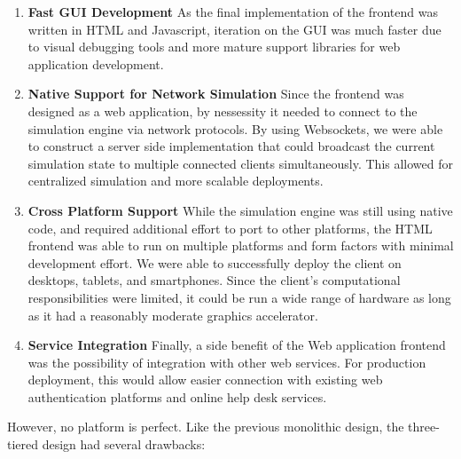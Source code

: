  \begin{enumerate}
   \item \textbf{Fast GUI Development} As the final implementation of
     the frontend was written in HTML and Javascript, iteration on the
     GUI was much faster due to visual debugging tools and more mature
     support libraries for web application development.

   \item \textbf{Native Support for Network Simulation} Since the
     frontend was designed as a web application, by nessessity it
     needed to connect to the simulation engine via network
     protocols. By using Websockets, we were able to construct a
     server side implementation that could broadcast the current
     simulation state to multiple connected clients
     simultaneously. This allowed for centralized simulation and more
     scalable deployments.

   \item \textbf{Cross Platform Support} While the simulation engine
     was still using native code, and required additional effort to
     port to other platforms, the HTML frontend was able to run on
     multiple platforms and form factors with minimal development
     effort. We were able to successfully deploy the client on
     desktops, tablets, and smartphones. Since the client's
     computational responsibilities were limited, it could be run a
     wide range of hardware as long as it had a reasonably moderate
     graphics accelerator.

   \item \textbf{Service Integration} Finally, a side benefit of the
     Web application frontend was the possibility of integration with
     other web services. For production deployment, this would allow
     easier connection with existing web authentication platforms and
     online help desk services. 
     
 \end{enumerate}


 However, no platform is perfect. Like the previous monolithic design,
 the three-tiered design had several drawbacks:


